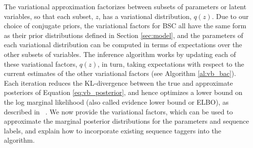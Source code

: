 %
The variational approximation factorizes between subsets of parameters or latent variables, so that each subset, $z$, has a variational distribution, $q(z)$. 
Due to our choice of conjugate priors, the variational factors for BSC all have
the same form as their prior distributions defined in Section \ref{sec:model},
and the parameters of each variational distribution can be computed in terms  of 
expectations over the other subsets of variables.
The inference algorithm works by updating each of these variational factors, $q(z)$, 
in turn,
taking expectations with respect to the current estimates of the other variational factors
(see Algorithm \ref{al:vb_bac}).
Each iteration reduces the KL-divergence between the true and approximate posteriors
of Equation \ref{eq:vb_posterior}, and hence optimizes a lower bound on the 
log marginal likelihood (also called evidence lower bound or ELBO), as described in
~\cite{bishop_pattern_2007,attias_advances_2000}.
We now provide the variational factors,
which can be used to approximate the marginal posterior distributions for the parameters and sequence
labels,
and explain how to incorporate existing sequence taggers into the algorithm.
